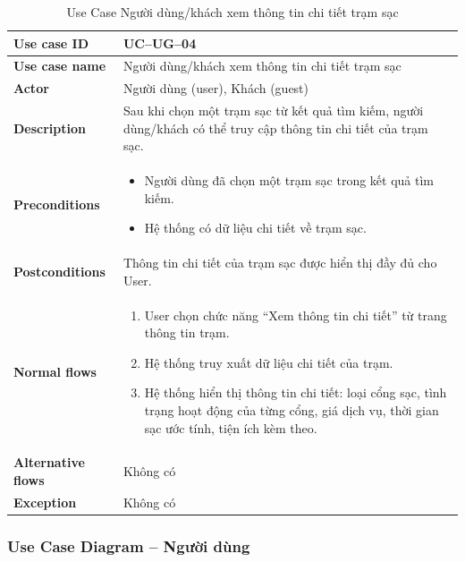 \begin{itemize}
\begin{longtable}{|m{}|m{}|}
          \caption{Use Case Người dùng/khách xem thông tin chi tiết trạm sạc} \\
  \hline
  \textbf{Use case ID} & UC--UG--04 \\
  \hline
  \textbf{Use case name} & Người dùng/khách xem thông tin chi tiết trạm sạc \\
  \hline
  \textbf{Actor} & Người dùng (user), Khách (guest) \\
  \hline
  \textbf{Description} & Sau khi chọn một trạm sạc từ kết quả tìm kiếm, người dùng/khách có thể truy cập thông tin chi tiết của trạm sạc. \\
  \hline
  \textbf{Preconditions} &
  \begin{itemize}
    \item Người dùng đã chọn một trạm sạc trong kết quả tìm kiếm.
    \item Hệ thống có dữ liệu chi tiết về trạm sạc.
  \end{itemize}\\
  \hline
  \textbf{Postconditions} & Thông tin chi tiết của trạm sạc được hiển thị đầy đủ cho User. \\
  \hline
  \textbf{Normal flows} &
  \begin{enumerate}[label=\arabic*.]
    \item User chọn chức năng “Xem thông tin chi tiết” từ trang thông tin trạm.
    \item Hệ thống truy xuất dữ liệu chi tiết của trạm.
    \item Hệ thống hiển thị thông tin chi tiết: loại cổng sạc, tình trạng hoạt động của từng cổng, giá dịch vụ, thời gian sạc ước tính, tiện ích kèm theo.
  \end{enumerate}\\
  \hline
  \textbf{Alternative flows} & Không có\\
  \hline
  \textbf{Exception} & Không có\\
  \hline
  \end{longtable}
\end{itemize}

\subsubsection{Use Case Diagram -- Người dùng}

